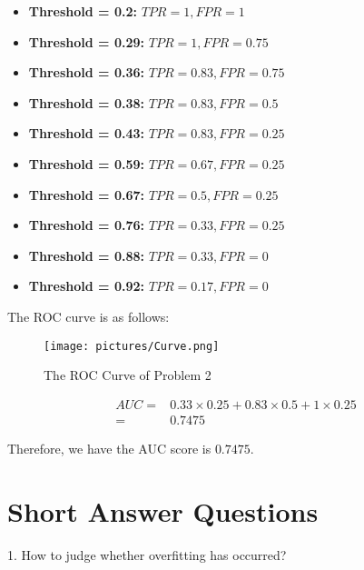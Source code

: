 \documentclass{article}
\begin{document}
\begin{itemize}
    \item \textbf{Threshold = 0.2: } $TPR = 1, FPR = 1$
    
    \item \textbf{Threshold = 0.29: } $TPR = 1, FPR = 0.75$
    
    \item \textbf{Threshold = 0.36: } $TPR = 0.83, FPR = 0.75$
    
    \item \textbf{Threshold = 0.38: } $TPR = 0.83, FPR = 0.5$
    
    \item \textbf{Threshold = 0.43: } $TPR = 0.83, FPR = 0.25$
    
    \item \textbf{Threshold = 0.59: } $TPR = 0.67, FPR = 0.25$
    
    \item \textbf{Threshold = 0.67: } $TPR = 0.5, FPR = 0.25$
    
    \item \textbf{Threshold = 0.76: } $TPR = 0.33, FPR = 0.25$
    
    \item \textbf{Threshold = 0.88: } $TPR = 0.33, FPR = 0$
    
    \item \textbf{Threshold = 0.92: } $TPR = 0.17, FPR = 0$
\end{itemize} 

The ROC curve is as follows:

\vspace{-0.6cm}\begin{figure}[H]
    \centering
    \texttt{[image: pictures/Curve.png]}
    \caption{The ROC Curve of Problem 2}
    \label{fig:ROC}
\end{figure}\vspace{-0.6cm}

\begin{equation}
    \begin{aligned}
        AUC = &0.33 \times 0.25 + 0.83 \times 0.5 + 1 \times 0.25 \\ 
            = &0.7475
    \end{aligned}
\end{equation}

Therefore, we have the AUC score is $0.7475$.

\newpage
\section{Short Answer Questions}
1. How to judge whether overfitting has occurred? \\ 
\end{document}
